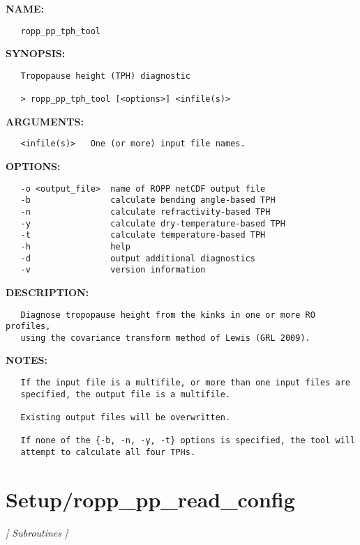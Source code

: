 \label{ch:robo92}
\label{ch:Programs_ropp_pp_tph_tool}
\textbf{NAME:}\hspace{0.08in}\begin{Verbatim}
   ropp_pp_tph_tool
\end{Verbatim}
\textbf{SYNOPSIS:}\hspace{0.08in}\begin{Verbatim}
   Tropopause height (TPH) diagnostic

   > ropp_pp_tph_tool [<options>] <infile(s)>
\end{Verbatim}
\textbf{ARGUMENTS:}\hspace{0.08in}\begin{Verbatim}
   <infile(s)>   One (or more) input file names.
\end{Verbatim}
\textbf{OPTIONS:}\hspace{0.08in}\begin{Verbatim}
   -o <output_file>  name of ROPP netCDF output file
   -b                calculate bending angle-based TPH
   -n                calculate refractivity-based TPH
   -y                calculate dry-temperature-based TPH
   -t                calculate temperature-based TPH
   -h                help
   -d                output additional diagnostics
   -v                version information
\end{Verbatim}
\textbf{DESCRIPTION:}\hspace{0.08in}\begin{Verbatim}
   Diagnose tropopause height from the kinks in one or more RO profiles, 
   using the covariance transform method of Lewis (GRL 2009).
\end{Verbatim}
\textbf{NOTES:}\hspace{0.08in}\begin{Verbatim}
   If the input file is a multifile, or more than one input files are
   specified, the output file is a multifile.

   Existing output files will be overwritten.

   If none of the {-b, -n, -y, -t} options is specified, the tool will 
   attempt to calculate all four TPHs.
\end{Verbatim}
\section{Setup/ropp\_pp\_read\_config}
\textsl{[ Subroutines ]}

